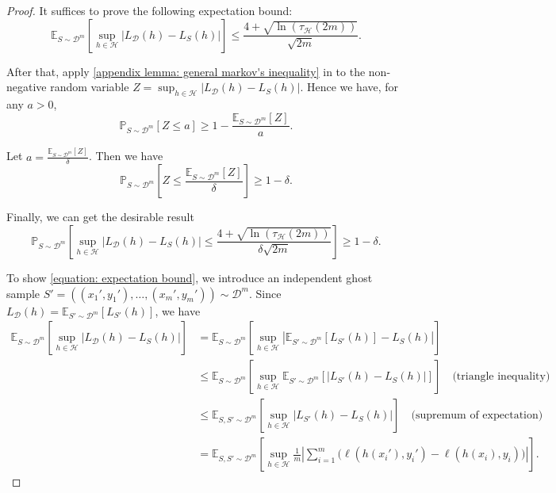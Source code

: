 \documentclass[openany, amssymb, psamsfonts]{amsart}
\theoremstyle{definition}
\numberwithin{equation}{section}
\begin{document}
\begin{proof}
It suffices to prove the following expectation bound:
\begin{equation}\label{equation: expectation bound}
\mathbb{E}_{S \sim \mathcal{D}^m} \left[ \sup_{h \in \mathcal{H}} |L_{\mathcal{D}}(h) - L_S(h)| \right] \leq \frac{4 + \sqrt{\ln(\tau_{\mathcal{H}}(2m))}}{\sqrt{2m}}.
\end{equation}

After that, apply \autoref{appendix lemma: general markov's inequality} in  to the non-negative random variable $Z=\sup_{h \in \mathcal{H}}|L_{\mathcal{D}}(h)-L_S(h)|$. Hence we have, for any $a > 0$,
\[
\mathbb{P}_{S \sim \mathcal{D}^m}[Z \leq a] \geq 1- \frac{\mathbb{E}_{S \sim \mathcal{D}^m}[Z]}{a}.
\]

Let $a=\frac{\mathbb{E}_{S \sim \mathcal{D}^m}[Z]}{\delta}$. Then we have 
\[
\mathbb{P}_{S \sim \mathcal{D}^m}\left[Z \leq \frac{\mathbb{E}_{S \sim \mathcal{D}^m}[Z]}{\delta}\right] \geq 1-\delta.
\]

Finally, we can get the desirable result
\[
\mathbb{P}_{S \sim \mathcal{D}^m}\left[\sup_{h \in \mathcal{H}}|L_{\mathcal{D}}(h)-L_S(h)| \leq \frac{4 + \sqrt{\ln(\tau_{\mathcal{H}}(2m))}}{\delta \sqrt{2m}}\right] \geq 1-\delta.
\]

To show \autoref{equation: expectation bound}, we introduce an independent ghost sample $S' = ((x_1',y_1'), \ldots, (x_m',y_m')) \sim \mathcal{D}^m$. Since $L_{\mathcal{D}}(h) = \mathbb{E}_{S'\sim \mathcal{D}^m}[L_{S'}(h)]$, we have
\begin{align*}
\mathbb{E}_{S\sim \mathcal{D}^m} \left[ \sup_{h \in \mathcal{H}} |L_{\mathcal{D}}(h) - L_S(h)| \right] 
&= \mathbb{E}_{S\sim \mathcal{D}^m} \left[ \sup_{h \in \mathcal{H}} \left| \mathbb{E}_{S'\sim \mathcal{D}^m}[L_{S'}(h)] - L_S(h) \right| \right] \\
&\leq \mathbb{E}_{S\sim \mathcal{D}^m} \left[ \sup_{h \in \mathcal{H}} \mathbb{E}_{S'\sim \mathcal{D}^m} \left[ |L_{S'}(h) - L_S(h)| \right] \right] \quad \text{(triangle inequality)} \\
&\leq \mathbb{E}_{S,S'\sim \mathcal{D}^m} \left[ \sup_{h \in \mathcal{H}} |L_{S'}(h) - L_S(h)| \right] \quad \text{(supremum of expectation)} \\
&= \mathbb{E}_{S,S'\sim \mathcal{D}^m} \left[ \sup_{h \in \mathcal{H}} \frac{1}{m} \left| \sum_{i=1}^m \bigl(\ell(h(x_i'), y_i') - \ell(h(x_i), y_i)\bigr) \right| \right]. \label{eq:symmetrized}
\end{align*}


\end{proof}
\end{document}
